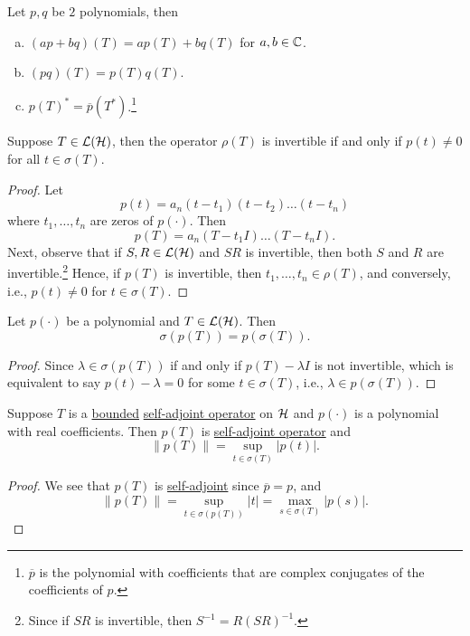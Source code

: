 \begin{theorem}
	Let \(p, q\) be \(2\) polynomials, then
	\begin{enumerate}[(a)]
		\item \((ap + bq)(T) = ap(T) + bq(T)\) for \(a, b\in \mathbb{\MakeUppercase{c}} \).
		\item \((pq)(T) = p(T) q(T)\).
		\item \(p(T)^{\ast} = \overline{p} (T^{\ast} )\).\footnote{\(\overline{p} \) is the polynomial with coefficients that are complex conjugates of the coefficients of \(p\).}
	\end{enumerate}
\end{theorem}

\begin{lemma}
	Suppose \(T\in \mathcal{\MakeUppercase{l}} (\mathcal{\MakeUppercase{h}} )\), then the operator \(\rho (T)\) is invertible if and only if \(p(t) \neq 0\) for all \(t\in \sigma (T)\).
\end{lemma}
\begin{proof}
	Let
	\[
		p(t) = a_n (t-t_1)(t-t_2)\ldots  (t-t_n)
	\]
	where \(t_1, \ldots  , t_n\) are zeros of \(p(\cdot)\). Then
	\[
		p(T) = a_n (T-t_1 I)\ldots  (T-t_n I).
	\]
	Next, observe that if \(S, R\in \mathcal{\MakeUppercase{l}} (\mathcal{\MakeUppercase{h}} )\) and \(SR\) is invertible, then both \(S\) and \(R\) are invertible.\footnote{Since if \(SR\) is invertible, then \(S^{-1} = R(SR)^{-1} \).} Hence, if \(p(T)\) is invertible, then \(t_1, \ldots  , t_n\in \rho (T)\), and conversely, i.e., \(p(t) \neq 0\) for \(t\in \sigma (T)\).
\end{proof}

\begin{proposition}
	Let \(p(\cdot)\) be a polynomial and \(T\in \mathcal{\MakeUppercase{l}} (\mathcal{\MakeUppercase{h}} )\). Then
	\[
		\sigma (p(T)) = p(\sigma (T)).
	\]
\end{proposition}
\begin{proof}
	Since \(\lambda \in \sigma (p(T))\) if and only if \(p(T) - \lambda I\) is not invertible, which is equivalent to say \(p(t) - \lambda = 0\) for some \(t\in \sigma (T)\), i.e., \(\lambda \in p(\sigma (T))\).
\end{proof}

\begin{corollary}\label{col:lec23}
	Suppose \(T\) is a \hyperref[rmk:bounded-op]{bounded} \hyperref[def:self-adjoint-op]{self-adjoint operator} on \(\mathcal{\MakeUppercase{h}} \) and \(p(\cdot)\) is a polynomial with real coefficients. Then \(p(T)\) is \hyperref[def:self-adjoint-op]{self-adjoint operator} and
	\[
		\lVert p(T) \rVert = \sup _{t\in \sigma (T)}\vert p(t) \vert.
	\]
\end{corollary}
\begin{proof}
	We see that \(p(T)\) is \hyperref[def:self-adjoint-op]{self-adjoint} since \(\overline{p} = p\), and
	\[
		\lVert p(T) \rVert = \sup _{t\in \sigma (p(T))} \vert t \vert = \max _{s\in \sigma (T)} \vert p(s) \vert .
	\]
\end{proof}